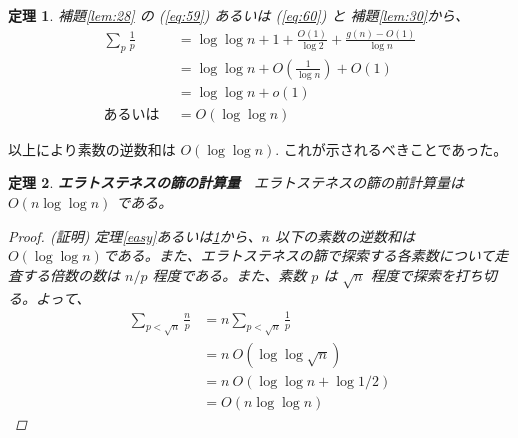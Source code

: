 \documentclass[12pt, a4j]{ltjsarticle}
\newtheorem{thm}{定理}
\begin{document}
\begin{thm} \label{hard}
補題\ref{lem:28} の {\rm (\ref{eq:59}) あるいは (\ref{eq:60})} と 補題\ref{lem:30}から、
\begin{align}
\sum_p \frac{1}{p} &= \log\log n + 1 + \frac{O(1)}{\log 2} + \frac{g(n) - O(1)}{\log n}\\
                   &= \log\log n + O\left(\frac{1}{\log n}\right) + O(1) \\
                   &= \log\log n + o(1) \\
       あるいは \ \  &= O(\log\log n)
\end{align}
\end{thm}

\vspace{1cm}

以上により素数の逆数和は $O(\log\log n)$. これが示されるべきことであった。

\vspace{1cm}

\begin{thm} {\bf エラトステネスの篩の計算量}　エラトステネスの篩の前計算量は $O(n\log\log n)$ である。
\begin{proof}(証明) \itshape 定理\ref{easy}あるいは\ref{hard}から、$n$ 以下の素数の逆数和は $O(\log\log n)$である。また、エラトステネスの篩で探索する各素数について走査する倍数の数は $n/p$ 程度である。また、素数 $p$ は $\sqrt{n}$ 程度で探索を打ち切る。よって、
\begin{align}
\sum_{p<\sqrt{n}} \frac{n}{p} &= n \sum_{p<\sqrt{n}} \frac{1}{p} \\
                              &= n\ O(\log\log\sqrt{n}) \\
                              &= n\ O(\log\log n + \log 1/2) \\
                              &= O(n\log\log n)
\end{align}
\end{proof}
\end{thm}

\newpage
\end{document}
